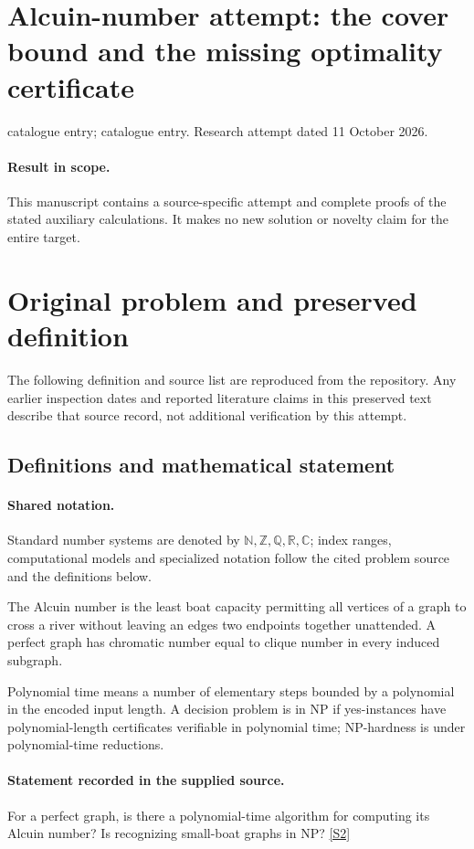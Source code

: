\documentclass[11pt]{article}
\begin{document}
\section*{Alcuin-number attempt: the cover bound and the missing optimality certificate}
\noindent catalogue entry; catalogue entry. Research attempt dated 11 October 2026.
\paragraph{Result in scope.}This manuscript contains a source-specific attempt and complete proofs of the stated auxiliary calculations. It makes no new solution or novelty claim for the entire target.
\section{Original problem and preserved definition}
The following definition and source list are reproduced from the repository. Any earlier inspection dates and reported literature claims in this preserved text describe that source record, not additional verification by this attempt.
\subsection{Definitions and mathematical statement}

\paragraph{Shared notation.}Standard number systems are denoted by $\mathbb N,\mathbb Z,\mathbb Q,\mathbb R,\mathbb C$; index ranges, computational models and specialized notation follow the cited problem source and the definitions below.


The Alcuin number is the least boat capacity permitting all vertices of a graph to cross a river without leaving an edge\textquotesingle s two endpoints together unattended. A perfect graph has chromatic number equal to clique number in every induced subgraph.

Polynomial time means a number of elementary steps bounded by a polynomial in the encoded input length. A decision problem is in $\mathrm{NP}$ if yes-instances have polynomial-length certificates verifiable in polynomial time; NP-hardness is under polynomial-time reductions.
\paragraph{Statement recorded in the supplied source.}
For a perfect graph, is there a polynomial-time algorithm for computing its Alcuin number? Is recognizing small-boat graphs in NP? \href{https://doi.org/10.4171/owr/2008/51}{[S2]}
\end{document}
